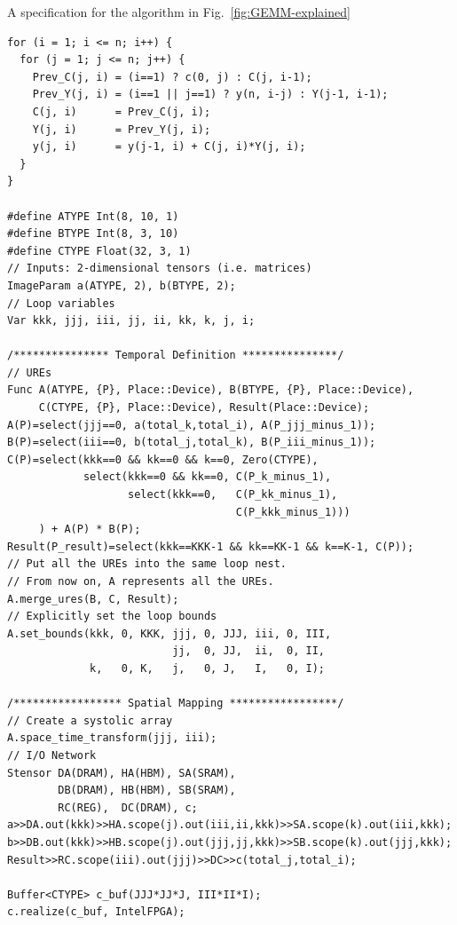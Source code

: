 \begin{listing}[htbp]
\caption{A specification for the algorithm in Fig.~\ref{fig:GEMM-explained}}
\label{lst:matrix-multiply-spec}
\vspace{-1ex}
\begin{verbatim}
for (i = 1; i <= n; i++) {
  for (j = 1; j <= n; j++) {
    Prev_C(j, i) = (i==1) ? c(0, j) : C(j, i-1);
    Prev_Y(j, i) = (i==1 || j==1) ? y(n, i-j) : Y(j-1, i-1);
    C(j, i)      = Prev_C(j, i);
    Y(j, i)      = Prev_Y(j, i);
    y(j, i)      = y(j-1, i) + C(j, i)*Y(j, i);
  }
}

#define ATYPE Int(8, 10, 1)
#define BTYPE Int(8, 3, 10)
#define CTYPE Float(32, 3, 1)
// Inputs: 2-dimensional tensors (i.e. matrices)
ImageParam a(ATYPE, 2), b(BTYPE, 2);
// Loop variables
Var kkk, jjj, iii, jj, ii, kk, k, j, i;

/*************** Temporal Definition ***************/
// UREs
Func A(ATYPE, {P}, Place::Device), B(BTYPE, {P}, Place::Device),
     C(CTYPE, {P}, Place::Device), Result(Place::Device);
A(P)=select(jjj==0, a(total_k,total_i), A(P_jjj_minus_1));
B(P)=select(iii==0, b(total_j,total_k), B(P_iii_minus_1));
C(P)=select(kkk==0 && kk==0 && k==0, Zero(CTYPE),
            select(kkk==0 && kk==0, C(P_k_minus_1), 
                   select(kkk==0,   C(P_kk_minus_1),
                                    C(P_kkk_minus_1)))
     ) + A(P) * B(P);
Result(P_result)=select(kkk==KKK-1 && kk==KK-1 && k==K-1, C(P));
// Put all the UREs into the same loop nest. 
// From now on, A represents all the UREs. 
A.merge_ures(B, C, Result);
// Explicitly set the loop bounds
A.set_bounds(kkk, 0, KKK, jjj, 0, JJJ, iii, 0, III,
                          jj,  0, JJ,  ii,  0, II,
             k,   0, K,   j,   0, J,   I,   0, I);

/***************** Spatial Mapping *****************/
// Create a systolic array
A.space_time_transform(jjj, iii);
// I/O Network
Stensor DA(DRAM), HA(HBM), SA(SRAM),
        DB(DRAM), HB(HBM), SB(SRAM),
        RC(REG),  DC(DRAM), c;
a>>DA.out(kkk)>>HA.scope(j).out(iii,ii,kkk)>>SA.scope(k).out(iii,kkk);
b>>DB.out(kkk)>>HB.scope(j).out(jjj,jj,kkk)>>SB.scope(k).out(jjj,kkk);
Result>>RC.scope(iii).out(jjj)>>DC>>c(total_j,total_i);

Buffer<CTYPE> c_buf(JJJ*JJ*J, III*II*I);
c.realize(c_buf, IntelFPGA);
\end{verbatim}
\vspace{-5ex}
\end{listing}
